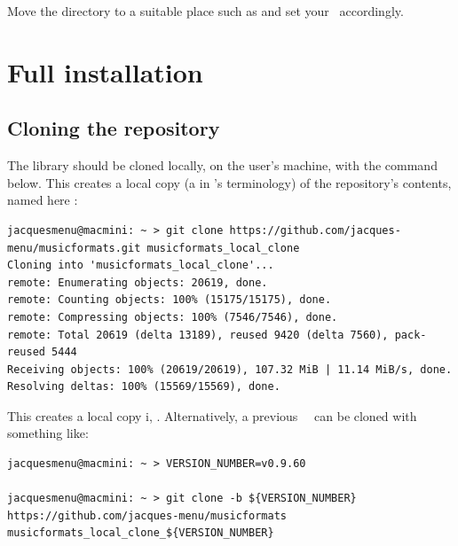Move the  directory to a suitable place such as  and set your  \environmentVariable\ accordingly.


\chapter{Full installation}

\section{Cloning the repository}

The library should be cloned locally, on the user's machine, with the command below. This creates a local copy (a  in \git's terminology) of the repository's contents, named here :
\begin{lstlisting}[language=Terminal]
jacquesmenu@macmini: ~ > git clone https://github.com/jacques-menu/musicformats.git musicformats_local_clone
Cloning into 'musicformats_local_clone'...
remote: Enumerating objects: 20619, done.
remote: Counting objects: 100% (15175/15175), done.
remote: Compressing objects: 100% (7546/7546), done.
remote: Total 20619 (delta 13189), reused 9420 (delta 7560), pack-reused 5444
Receiving objects: 100% (20619/20619), 107.32 MiB | 11.14 MiB/s, done.
Resolving deltas: 100% (15569/15569), done.
\end{lstlisting}

This creates a local copy i, \masterBranch.
Alternatively, a previous \mf\ \version\ can be cloned with something like:
\begin{lstlisting}[language=Terminal]
jacquesmenu@macmini: ~ > VERSION_NUMBER=v0.9.60

jacquesmenu@macmini: ~ > git clone -b ${VERSION_NUMBER} https://github.com/jacques-menu/musicformats musicformats_local_clone_${VERSION_NUMBER}
\end{lstlisting}

